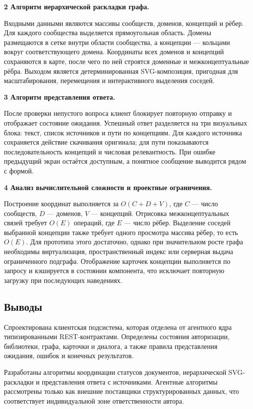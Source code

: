 \vspace{0.5em}
\textbf{2 Алгоритм иерархической раскладки графа.}

Входными данными являются массивы сообществ, доменов, концепций и рёбер. Для каждого сообщества выделяется прямоугольная область. Домены размещаются в сетке внутри области сообщества, а концепции --- кольцами вокруг соответствующего домена. Координаты всех доменов и концепций сохраняются в карте, после чего по ней строятся доменные и межконцептуальные рёбра. Выходом является детерминированная SVG-композиция, пригодная для масштабирования, перемещения и интерактивного выделения соседей.

\vspace{0.5em}
\textbf{3 Алгоритм представления ответа.}

После проверки непустого вопроса клиент блокирует повторную отправку и отображает состояние ожидания. Успешный ответ разделяется на три визуальных блока: текст, список источников и пути по концепциям. Для каждого источника сохраняется действие скачивания оригинала; для пути показываются последовательность концепций и числовая релевантность. При ошибке предыдущий экран остаётся доступным, а понятное сообщение выводится рядом с формой.

\vspace{0.5em}
\textbf{4 Анализ вычислительной сложности и проектные ограничения.}

Построение координат выполняется за $O(C+D+V)$, где $C$ --- число сообществ, $D$ --- доменов, $V$ --- концепций. Отрисовка межконцептуальных связей требует $O(E)$ операций, где $E$ --- число рёбер. Выделение соседей выбранной концепции также требует одного просмотра массива рёбер, то есть $O(E)$. Для прототипа этого достаточно, однако при значительном росте графа необходимы виртуализация, пространственный индекс или серверная выдача ограниченного подграфа. Отображение карточек концепции выполняется по запросу и кэшируется в состоянии компонента, что исключает повторную загрузку при последующих наведениях.

\subsection{Выводы}

Спроектирована клиентская подсистема, которая отделена от агентного ядра типизированными REST-контрактами. Определены состояния авторизации, библиотеки, графа, карточки и диалога, а также правила представления ожидания, ошибок и конечных результатов.

Разработаны алгоритмы координации статусов документов, иерархической SVG-раскладки и представления ответа с источниками. Агентные алгоритмы рассмотрены только как внешние поставщики структурированных данных, что соответствует индивидуальной зоне ответственности автора.
